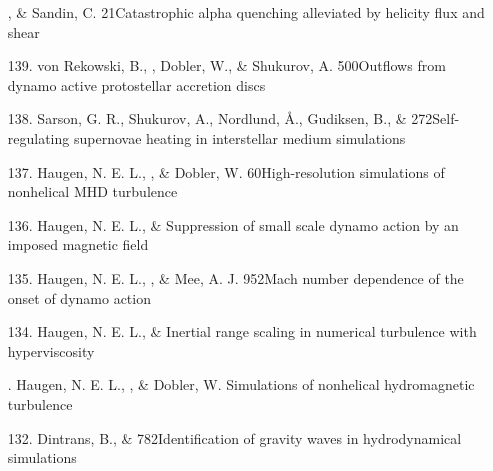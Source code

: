 \begin{itemize}
\item[\relevant {140.}]
\Brandenburg, \& Sandin, C.
{21}{Catastrophic alpha quenching alleviated by helicity flux and shear}

\item[139.]
von Rekowski, B., \Brandenburg, Dobler, W.,
\& Shukurov, A.
{500}{Outflows from dynamo active protostellar accretion discs}

\item[138.]
Sarson, G. R., Shukurov, A., Nordlund, \AA., Gudiksen, B., \& \Brandenburg{}
{272}{Self-regulating supernovae heating in interstellar medium simulations}

\item[137.]
Haugen, N. E. L., \Brandenburg, \& Dobler, W.
{60}{High-resolution simulations of nonhelical MHD turbulence}

\item[{136.}]
Haugen, N. E. L., \& \Brandenburg{}
{Suppression of small scale dynamo action by an imposed magnetic field}

\item[{135.}]
Haugen, N. E. L., \Brandenburg, \& Mee, A. J.
{952}{Mach number dependence of the onset of dynamo action}

\item[{134.}]
Haugen, N. E. L., \& \Brandenburg{}
{Inertial range scaling in numerical turbulence with hyperviscosity}

\item[\important 133.]
Haugen, N. E. L., \Brandenburg, \& Dobler, W.
{Simulations of nonhelical hydromagnetic turbulence}

\item[{132.}]
Dintrans, B., \& \Brandenburg{}
{782}{Identification of gravity waves in hydrodynamical simulations}


\end{itemize}

